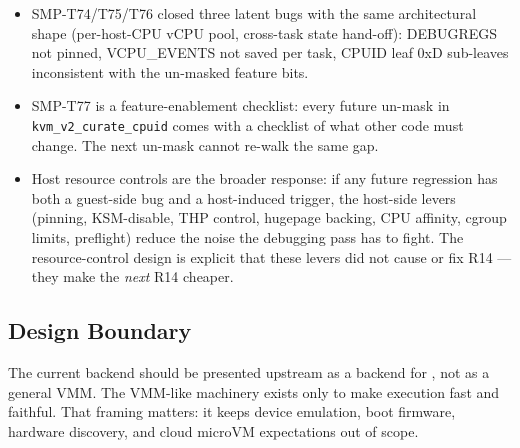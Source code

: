 \begin{itemize}
  \item SMP-T74/T75/T76 closed three latent bugs with the same
        architectural shape (per-host-CPU vCPU pool, cross-task
        state hand-off): DEBUGREGS not pinned, VCPU\_EVENTS not
        saved per task, CPUID leaf 0xD sub-leaves inconsistent
        with the un-masked feature bits.
  \item SMP-T77 is a feature-enablement checklist:
        every future un-mask in
        \texttt{kvm\_v2\_curate\_cpuid} comes with a checklist of
        what other code must change. The next un-mask cannot
        re-walk the same gap.
  \item Host resource controls are the broader response:
        if any future regression has both a guest-side bug and a
        host-induced trigger, the host-side levers (pinning,
        KSM-disable, THP control, hugepage backing, CPU affinity,
        cgroup limits, preflight) reduce the noise the
        debugging pass has to fight. The resource-control design is
        explicit that these levers did not cause or fix R14 --- they
        make the \emph{next} R14 cheaper.
\end{itemize}

\subsection{Design Boundary}

The current backend should be presented upstream as a backend for
\UML{}, not as a general VMM. The VMM-like machinery exists only to
make \UML{} execution fast and faithful. That framing matters: it
keeps device emulation, boot firmware, hardware discovery, and cloud
microVM expectations out of scope.
